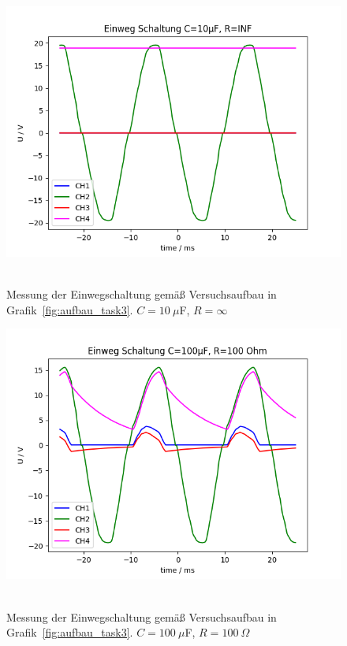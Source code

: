 \documentclass{article}
\begin{document}
\begin{figure}[H]
\caption{Messung der Einwegschaltung gemäß Versuchsaufbau in Grafik~\ref{fig:aufbau_task3}. $C=10~\mu$F, $R=\infty$}
\label{fig:grafik_task3_10_inf}
{\centering
\includegraphics[scale=0.6]{bilder/task3_10mu_Rinf.png}
~
}
\end{figure}





\begin{figure}[H]
\caption{Messung der Einwegschaltung gemäß Versuchsaufbau in Grafik~\ref{fig:aufbau_task3}. $C=100~\mu$F, $R=100~\Omega$}
\label{fig:grafik_task3_100_100}
{\centering
\includegraphics[scale=0.6]{bilder/task3_100mu_R100.png}
~
}
\end{figure}
\end{document}
